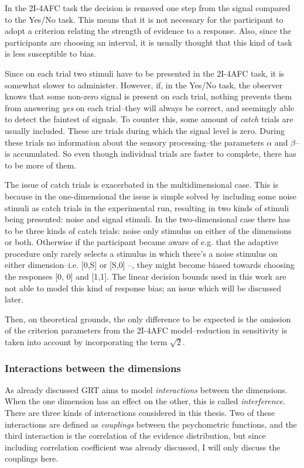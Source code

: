 \documentclass{article}\usepackage{knitr}
\begin{document}
In the 2I-4AFC task the decision is removed one step from the signal compared to the Yes/No task. This means that it is not necessary for the participant to adopt a criterion relating the strength of evidence to a response. Also, since the participants are choosing an interval, it is usually thought that this kind of task is less susceptible to bias.

Since on each trial two stimuli have to be presented in the 2I-4AFC task, it is somewhat slower to administer. However, if, in the Yes/No task, the observer knows that some non-zero signal is present on each trial, nothing prevents them from answering \textit{yes} on each trial--they will always be correct, and seemingly able to detect the faintest of signals. To counter this, some amount of \textit{catch} trials are usually included. These are trials during which the signal level is zero. During these trials no information about the sensory processing--the parameters $\alpha$ and $\beta$--is accumulated. So even though individual trials are faster to complete, there has to be more of them. 

The issue of catch trials is exacerbated in the multidimensional case. This is because in the one-dimensional the issue is simple solved by including some noise stimuli as catch trials in the experimental run, resulting in two kinds of stimuli being presented: noise and signal stimuli. In the two-dimensional case there has to be three kinds of catch trials: noise only stimulus on either of the dimensions or both. Otherwise if the participant became aware of e.g. that the adaptive procedure only rarely selects a stimulus in which there's a noise stimulus on either dimension--i.e. [0,S] or [S,0] --, they might become biased towards choosing the responses [0, 0] and [1,1]. The linear decision bounds used in this work are not able to model this kind of response bias; an issue which will be discussed later. 

Then, on theoretical grounds, the only difference to be expected is the omission of the criterion parameters from the 2I-4AFC model--reduction in sensitivity is taken into account by incorporating the term $\sqrt{2}$. 

\subsubsection{Interactions between the dimensions}

As already discussed GRT aims to model \textit{interactions} between the dimensions. When the one dimension has an effect on the other, this is called \textit{interference}. There are three kinds of interactions considered in this thesis. Two of these interactions are defined as \textit{couplings} between the psychometric functions, and the third interaction is the correlation of the evidence distribution, but since including correlation coefficient was already discussed, I will only discuss the couplings here.
\end{document}
